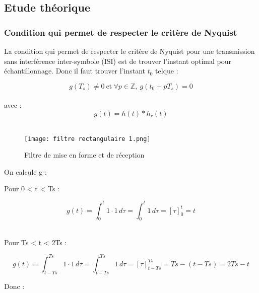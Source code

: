 \documentclass[11pt]{article}
\begin{document}
\subsection{Etude théorique}
\subsubsection{Condition qui permet de respecter le critère de Nyquist}
La condition qui permet de respecter le critère de Nyquist pour une transmission sans interférence inter-symbole (ISI) est de trouver l'instant optimal pour échantillonnage. Donc il faut trouver l'instant $t_0$ telque :

$$ g(T_s) \neq 0 \
\text{et} \ \forall p \in \mathbb{Z}, \ g(t_0+pT_s) = 0 $$ \\

avec : $$ g(t) = h(t) * h_r(t) $$ \\

\begin{figure}[ht!]
            \centering
            \texttt{[image: filtre rectangulaire 1.png]}
            \caption{Filtre de mise en forme et de réception 
            \label{fig : filtre}}
\end{figure}

On calcule g : 

Pour 0 < t < Ts :

$$ g(t) = \int_{0}^{t} 1 \cdot 1 \, d\tau = \int_{0}^{t} 1 \, d\tau = [ \tau ]_{0}^{t} = t $$

\\
Pour Ts < t < 2Ts :

$$ g(t) = \int_{t - Ts}^{Ts} 1 \cdot 1 \, d\tau = \int_{t - Ts}^{Ts} 1 \, d\tau = [ \tau ]_{t - Ts}^{Ts} = Ts - (t - Ts) = 2Ts - t $$

Donc :
\end{document}
